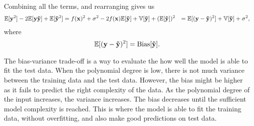 Combining all the terms, and rearranging gives us
\begin{align*}
    \mathbb{E} [ \mathbf{y}^{2} ] - 2 \mathbb{E} [ \mathbf{y} \mathbf{\Tilde{y}} ] + \mathbb{E} [ \mathbf{\Tilde{y}}^{2} ] &= f(\mathbf{x})^{2} + \sigma^{2} - 2 f(\mathbf{x}) \mathbb{E} [ \mathbf{\Tilde{y}} ] + \mathbb{V}[\mathbf{\Tilde{y}}] + (\mathbb{E} [ \mathbf{\Tilde{y}} ])^{2} 
    &= \mathbb{E} [ (\mathbf{y} - \mathbf{\Tilde{y}})^{2} ] + \mathbb{V}[\mathbf{\Tilde{y}}] + \sigma^{2} , 
\end{align*}
where 
\begin{align*}
    \mathbb{E} [ (\mathbf{y} - \mathbf{\Tilde{y}})^{2} ] = \text{Bias}[\mathbf{\Tilde{y}}]. 
\end{align*}

The bias-variance trade-off is a way to evaluate the how well the model is able to fit the test data. When the polynomial degree is low, there is not much variance between the training data and the test data. However, the bias might be higher as it fails to predict the right complexity of the data. As the polynomial degree of the input increases, the variance increases. The bias decreases until the sufficient model complexity is reached. This is where the model is able to fit the training data, without overfitting, and also make good predictions on test data. 